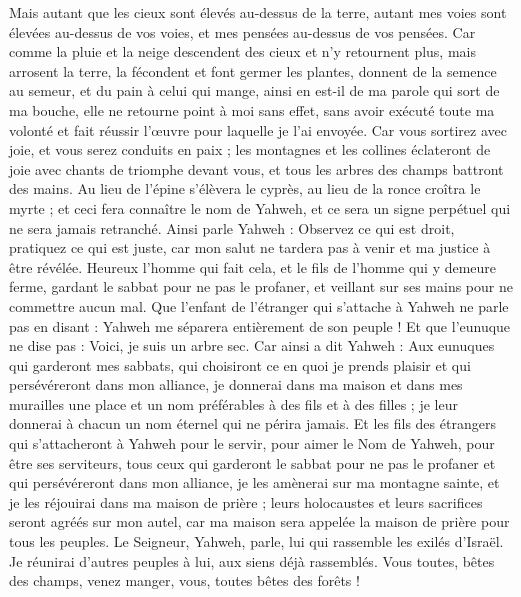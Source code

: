 \begin{multicols}{2}
Mais autant que les cieux sont élevés au-dessus de la terre, autant mes voies sont élevées au-dessus de vos voies, et mes pensées au-dessus de vos pensées.
Car comme la pluie et la neige descendent des cieux et n'y retournent plus, mais arrosent la terre, la fécondent et font germer les plantes, donnent de la semence au semeur, et du pain à celui qui mange,
ainsi en est-il de ma parole qui sort de ma bouche, elle ne retourne point à moi sans effet, sans avoir exécuté toute ma volonté et fait réussir l'œuvre pour laquelle je l'ai envoyée.
Car vous sortirez avec joie, et vous serez conduits en paix ; les montagnes et les collines éclateront de joie avec chants de triomphe devant vous, et tous les arbres des champs battront des mains.
Au lieu de l'épine s'élèvera le cyprès, au lieu de la ronce croîtra le myrte ; et ceci fera connaître le nom de Yahweh, et ce sera un signe perpétuel qui ne sera jamais retranché.
\VerseOne{}Ainsi parle Yahweh : Observez ce qui est droit, pratiquez ce qui est juste, car mon salut ne tardera pas à venir et ma justice à être révélée.
Heureux l'homme qui fait cela, et le fils de l'homme qui y demeure ferme, gardant le sabbat pour ne pas le profaner, et veillant sur ses mains pour ne commettre aucun mal.
Que l'enfant de l'étranger qui s'attache à Yahweh ne parle pas en disant : Yahweh me séparera entièrement de son peuple ! Et que l'eunuque ne dise pas : Voici, je suis un arbre sec.
Car ainsi a dit Yahweh : Aux eunuques qui garderont mes sabbats, qui choisiront ce en quoi je prends plaisir et qui persévéreront dans mon alliance,
je donnerai dans ma maison et dans mes murailles une place et un nom préférables à des fils et à des filles ; je leur donnerai à chacun un nom éternel qui ne périra jamais.
Et les fils des étrangers qui s'attacheront à Yahweh pour le servir, pour aimer le Nom de Yahweh, pour être ses serviteurs, tous ceux qui garderont le sabbat pour ne pas le profaner et qui persévéreront dans mon alliance,
je les amènerai sur ma montagne sainte, et je les réjouirai dans ma maison de prière ; leurs holocaustes et leurs sacrifices seront agréés sur mon autel, car ma maison sera appelée la maison de prière pour tous les peuples.
Le Seigneur, Yahweh, parle, lui qui rassemble les exilés d'Israël. Je réunirai d'autres peuples à lui, aux siens déjà rassemblés.
Vous toutes, bêtes des champs, venez manger, vous, toutes bêtes des forêts !

\end{multicols}
